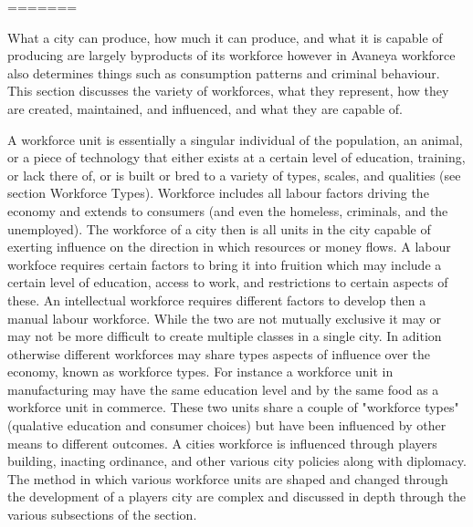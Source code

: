 =======


What a city can produce, how much it can produce, and what it is capable of producing are largely byproducts of its workforce however in Avaneya workforce also determines things such as consumption patterns and criminal behaviour. This section discusses the variety of workforces, what they represent, how they are created, maintained, and influenced, and what they are capable of. 

A workforce unit is essentially a singular individual of the population, an animal, or a piece of technology that either exists at a certain level of education, training, or lack there of, or is built or bred to a variety of types, scales, and qualities (see section Workforce Types). Workforce includes all labour factors driving the economy and extends to consumers (and even the homeless, criminals, and the unemployed). The workforce of a city then is all units in the city capable of exerting influence on the direction in which resources or money flows. A labour workfoce requires certain factors to bring it into fruition which may include a certain level of education, access to work, and restrictions to certain aspects of these. An intellectual workforce requires different factors to develop then a manual labour workforce. While the two are not mutually exclusive it may or may not be more difficult to create multiple classes in a single city. In adition otherwise different workforces may share types aspects of influence over the economy, known as workforce types. For instance a workforce unit in manufacturing may have the same education level and by the same food as a workforce unit in commerce. These two units share a couple of "workforce types" (qualative education and consumer choices) but have been influenced by other means to different outcomes. A cities workforce is influenced through players building, inacting ordinance, and other various city policies along with diplomacy. The method in which various workforce units are shaped and changed through the development of a players city are complex and discussed in depth through the various subsections of the section.

